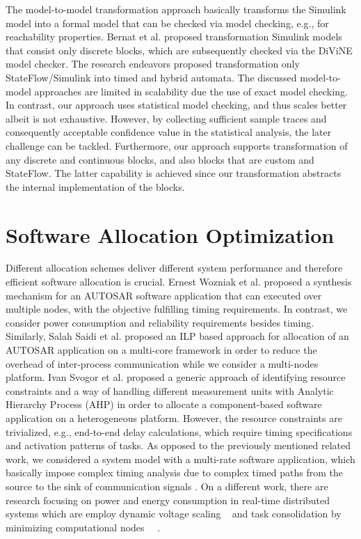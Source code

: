 The model-to-model transformation approach basically transforms the Simulink model into a formal model that can be checked via model checking, e.g., for reachability properties. Bernat et al. \cite{Meenakshi2006ToolChecker} proposed transformation Simulink models that consist only discrete blocks, which are subsequently checked via the DiViNE model checker. The research endeavors proposed transformation only StateFlow/Simulink into timed and hybrid automata. The discussed model-to-model approaches are limited in scalability due the use of exact model checking. In contrast, our approach uses statistical model checking, and thus scales better albeit is not exhaustive. However, by collecting sufficient sample traces and consequently acceptable confidence value in the statistical analysis, the later challenge can be tackled. Furthermore, our approach supports transformation of any discrete and continuous blocks, and also blocks that are custom and StateFlow. The latter capability is achieved since our transformation abstracts the internal implementation of the blocks.


\section{Software Allocation Optimization}
Different allocation schemes deliver different system performance and therefore efficient software allocation is crucial. Ernest Wozniak et al. \cite{Wozniak2013AnArchitectures} proposed a synthesis mechanism for an AUTOSAR software application that can executed over multiple nodes, with the objective fulfilling timing requirements. In contrast, we consider power consumption and reliability requirements besides timing. Similarly, Salah Saidi et al. \cite{Saidi2015AnArchitectures} proposed an ILP based approach for allocation of an AUTOSAR application on a multi-core framework in order to reduce the overhead of inter-process communication while we consider a multi-nodes platform. Ivan Svogor et al. \cite{vsvogor2014extended} proposed a generic approach of identifying resource constraints and a way of handling different measurement units with Analytic Hierarchy Process (AHP) in order to allocate a component-based software application on a heterogeneous platform. However, the resource constraints are trivialized, e.g., end-to-end delay calculations, which require timing specifications and activation patterns of tasks. As opposed to the previously mentioned related work, we considered a system model with a multi-rate software application, which basically impose complex timing analysis due to complex timed paths from the source to the sink of communication signals \cite{mubeen2013support}. On a different work, there are research focusing on power and energy consumption in real-time distributed systems which are employ dynamic voltage scaling ~\cite{bambagini2016energy} and task consolidation by minimizing computational nodes ~\cite{faragardi2013towards}~\cite{devadas2012interplay}.